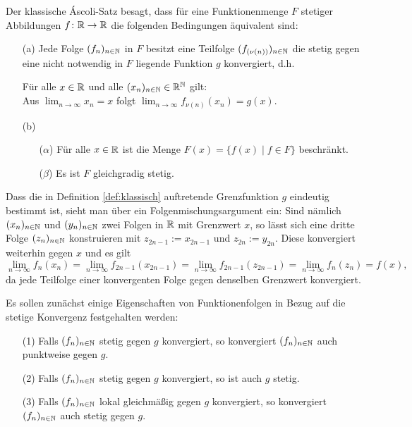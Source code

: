 \begin{defn}
  \label{def:klassisch}
  Der klassische Áscoli-Satz besagt, dass für eine Funktionenmenge $F$ stetiger Abbildungen $f \colon \mathbb{R} \to \mathbb{R}$ die folgenden Bedingungen äquivalent sind:
  \begin{itemize}
    \item[(a)] Jede Folge $(f_n)_{n \in \mathbb{N}}$ in $F$ besitzt eine Teilfolge $(f_{(\nu(n))})_{n \in \mathbb{N}}$ die stetig gegen eine nicht notwendig in $F$ liegende Funktion $g$ konvergiert, d.h.
      \begin{addmargin}[2em]{2em}%
        Für alle $x \in \mathbb{R}$ und alle $(x_n)_{n \in \mathbb{N}} \in \mathbb{R}^{\mathbb{N}}$ gilt: \\
        Aus $\lim_{n \to \infty} x_n = x$ folgt $\lim_{n \to \infty} f_{\nu(n)}(x_n) = g(x)$.
      \end{addmargin}
    \item[(b)]
      \begin{itemize}
        \item[($\alpha$)] Für alle $x \in \mathbb{R}$ ist die Menge $F(x) = \{ f(x) \mid f \in F\}$ beschränkt.
        \item[($\beta$)] Es ist $F$ gleichgradig stetig.
      \end{itemize}
  \end{itemize}
\end{defn}

Dass die in Definition \ref{def:klassisch} auftretende Grenzfunktion $g$ eindeutig bestimmt ist, sieht man über ein Folgenmischungsargument ein:
Sind nämlich $(x_n)_{n \in \mathbb{N}}$ und $(y_n)_{n \in \mathbb{N}}$ zwei Folgen in $\mathbb{R}$ mit Grenzwert $x$, so lässt sich eine dritte Folge $(z_n)_{n \in \mathbb{N}}$ konstruieren mit $z_{2n-1} := x_{2n-1}$ und $z_{2n} := y_{2n}$.
Diese konvergiert weiterhin gegen $x$ und es gilt 
\begin{displaymath}
   \lim_{n \to \infty} f_{n}(x_n) 
  =\lim_{n \to \infty} f_{2n-1}(x_{2n-1}) 
  =\lim_{n \to \infty} f_{2n-1}(z_{2n-1}) 
  =\lim_{n \to \infty} f_n(z_n) = f(x),
\end{displaymath}
da jede Teilfolge einer konvergenten Folge gegen denselben Grenzwert konvergiert.

Es sollen zunächst einige Eigenschaften von Funktionenfolgen in Bezug auf die stetige Konvergenz festgehalten werden:

\begin{prop}
  \label{prop:stetigkonv}
  \begin{itemize}
    \item[(1)] Falls $(f_n)_{n \in \mathbb{N}}$ stetig gegen $g$ konvergiert, so konvergiert $(f_n)_{n \in \mathbb{N}}$ auch punktweise gegen $g$.
    \item[(2)] Falls $(f_n)_{n \in \mathbb{N}}$ stetig gegen $g$ konvergiert, so ist auch $g$ stetig.
    \item[(3)] Falls $(f_n)_{n \in \mathbb{N}}$ lokal gleichmäßig gegen $g$ konvergiert, so konvergiert $(f_n)_{n \in \mathbb{N}}$ auch stetig gegen $g$.
  \end{itemize}
\end{prop}


